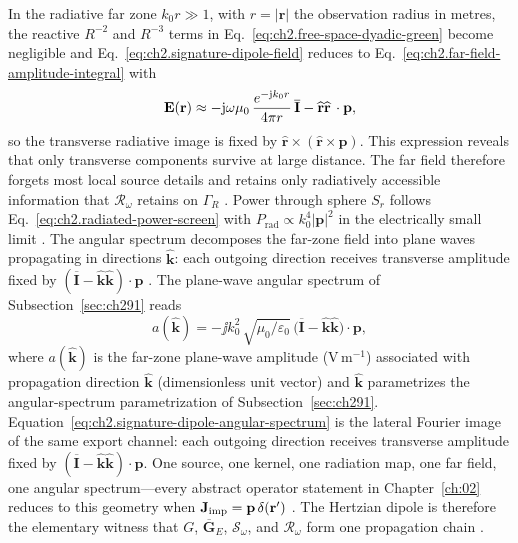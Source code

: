 In the radiative far zone \(k_0 r\gg 1\), with \(r=|\mathbf{r}|\) the observation radius
in metres, the reactive \(R^{-2}\) and \(R^{-3}\) terms in
Eq.~\eqref{eq:ch2.free-space-dyadic-green} become negligible and
Eq.~\eqref{eq:ch2.signature-dipole-field} reduces to
Eq.~\eqref{eq:ch2.far-field-amplitude-integral} with
\begin{equation}
\label{eq:ch2.signature-dipole-far-field}
\mathbf{E}(\mathbf{r})\approx
-\mathrm{j}\omega\mu_0\,\frac{e^{-\mathrm{j} k_0 r}}{4\pi r}\,
\overline{\mathbf{I}}-\widehat{\mathbf{r}}\widehat{\mathbf{r}}\,\cdot\mathbf{p},
\end{equation}
so the transverse radiative image is fixed by \(\widehat{\mathbf{r}}\times(\widehat{\mathbf{r}}\times\mathbf{p})\).
This expression reveals that only transverse components survive at large distance. The far
field therefore forgets most local source details and retains only radiatively accessible
information that $\mathcal{R}_\omega$ retains on $\Gamma_R$ \cite{stratton1941}.
Power through sphere \(S_r\) follows Eq.~\eqref{eq:ch2.radiated-power-screen} with
\(P_{\mathrm{rad}}\propto k_0^{4}|\mathbf{p}|^{2}\) in the electrically small limit
\cite{stratton1941}. The angular spectrum decomposes the far-zone field into plane waves
propagating in directions $\widehat{\mathbf{k}}$: each outgoing direction receives
transverse amplitude fixed by $(\overline{\mathbf{I}}-\widehat{\mathbf{k}}\widehat{\mathbf{k}})\cdot\mathbf{p}$
\cite{stratton1941}. The plane-wave angular spectrum of
Subsection~\ref{sec:ch291} reads
\begin{equation}
\label{eq:ch2.signature-dipole-angular-spectrum}
a(\widehat{\mathbf{k}})
=
-\jj k_0^{2}\,\sqrt{\mu_0/\varepsilon_0}\,
\big(\overline{\mathbf{I}}-\widehat{\mathbf{k}}\widehat{\mathbf{k}}\big)\cdot\mathbf{p},
\end{equation}
where \(a(\widehat{\mathbf{k}})\) is the far-zone plane-wave amplitude (V\,m\(^{-1}\))
associated with propagation direction \(\widehat{\mathbf{k}}\) (dimensionless unit vector)
and \(\widehat{\mathbf{k}}\) parametrizes the angular-spectrum parametrization of
Subsection~\ref{sec:ch291}. Equation~\eqref{eq:ch2.signature-dipole-angular-spectrum}
is the lateral Fourier image of the same export channel: each outgoing direction receives
transverse amplitude fixed by $(\overline{\mathbf{I}}-\widehat{\mathbf{k}}\widehat{\mathbf{k}})\cdot\mathbf{p}$.
One source, one kernel, one radiation map, one far field, one angular spectrum---every
abstract operator statement in Chapter~\ref{ch:02} reduces to this geometry when
\(\mathbf{J}_{\mathrm{imp}}=\mathbf{p}\,\delta(\mathbf{r}')\) \cite{stratton1941}. The Hertzian dipole is
therefore the elementary witness that $G$, $\overline{\mathbf{G}}_{E}$, $\mathcal{S}_\omega$,
and $\mathcal{R}_\omega$ form one propagation chain \cite{jackson1999}.
